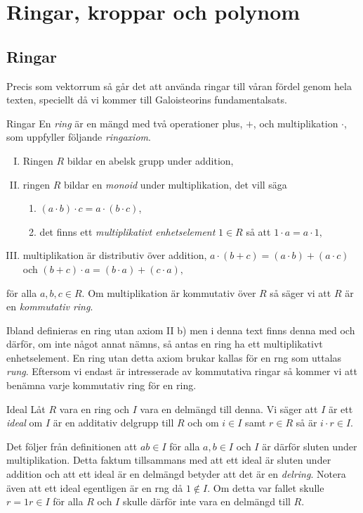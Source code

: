 \documentclass{article}
\theoremstyle{definition}
\begin{document}
\section{Ringar, kroppar och polynom}
\subsection{Ringar}
Precis som vektorrum så går det att använda ringar till våran fördel genom hela texten, speciellt då vi kommer till
Galoisteorins fundamentalsats.
\begin{mydef}{Ringar}{}
  En \textit{ring} är en mängd med två operationer plus, $+$, och multiplikation $\cdot$, som uppfyller följande \textit{ringaxiom}.
  \begin{enumerate}[I)]
    \item Ringen $R$ bildar en abelsk grupp under addition,
    \item ringen $R$ bildar en \textit{monoid} under multiplikation, det vill säga 
    \begin{enumerate}
      \item $(a \cdot b) \cdot c = a \cdot (b \cdot c)$,
      \item det finns ett \textit{multiplikativt enhetselement} $1 \in R$ så att $1 \cdot a = a \cdot 1,$
    \end{enumerate}
    \item multiplikation är distributiv över addition, $a \cdot (b+c) = (a \cdot b) + (a \cdot c)$ och $(b + c) \cdot a = (b \cdot a) + (c \cdot a),$
  \end{enumerate}
  för alla $a, b, c \in R$. Om multiplikation är kommutativ över $R$ så säger vi att $R$ är en \textit{kommutativ ring}. 
\end{mydef}
Ibland definieras en ring utan axiom II b) men i denna text finns denna med och därför, om inte något annat nämns, så antas en ring ha ett multiplikativt enhetselement. 
En ring utan detta axiom brukar kallas för en rng som uttalas \textit{rung}. Eftersom vi endast är intresserade av kommutativa ringar så kommer vi 
att benämna varje kommutativ ring för en ring. 

\begin{mydef}{Ideal}{}
  Låt $R$ vara en ring och $I$ vara en delmängd till denna. Vi säger att $I$ är ett \textit{ideal} om $I$ är en additativ delgrupp till $R$
  och om $i \in I$ samt $r \in R$ så är $i \cdot r \in I$. 
\end{mydef}
Det följer från definitionen att $ab \in I$ för alla $a, b \in I$ och $I$ är därför sluten under multiplikation. Detta faktum tillsammans 
med att ett ideal är sluten under addition och att ett ideal är en delmängd betyder att det är en \textit{delring}.
Notera även att ett ideal egentligen är en rng då $1 \notin I$. Om detta var fallet skulle 
$r = 1r \in I$ för alla $R$ och $I$ skulle därför inte vara en delmängd till $R$. 
\end{document}
